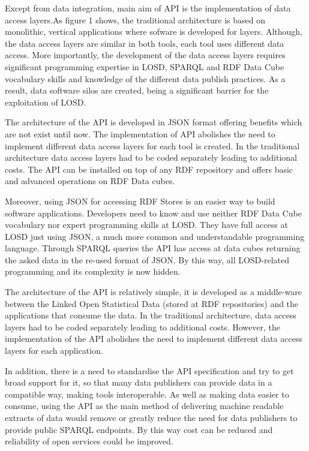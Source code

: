\documentclass{llncs}
\begin{document}
Except from data integration, main aim of API is the implementation of data access layers.As figure 1 shows, the traditional architecture is based on monolithic, vertical applications where sofware is developed for layers. Although, the data access layers are similar in both
tools, each tool uses different data access. More importantly, the development of the data access layers requires significant programming expertise in LOSD, SPARQL and RDF Data Cube vocabulary skills and knowledge of the different data publish practices. As a result, data software silos are created, being a significant barrier for the exploitation of LOSD. 

The architecture of the API is developed in JSON format offering benefits which are not exist until now. The implementation of API abolishes the need to implement different data access layers for each tool is created. In the traditional architecture data access layers had to be coded separately leading to additional costs. The API can be installed on top of any RDF repository and offers basic and advanced operations on RDF Data cubes.
 
Moreover, using JSON for accessing RDF Stores is an easier way to build software applications. Developers need to know and use neither RDF Data Cube vocabulary nor expert programming skills at LOSD. They have full access at LOSD just using JSON, a much more common and understandable programming language. Through SPARQL queries the API has access at data cubes returning the asked data in the re-used format of JSON. By this way, all LOSD-related programming and its complexity is now hidden.

The architecture of the API is relatively simple, it is developed as a middle-ware between the Linked Open Statistical Data (stored at RDF repositories) and the applications that consume the data. In the traditional architecture, data access layers had to be coded separately leading to additional costs. However, the implementation of the API abolishes the need to implement different data access layers for each application. 

In addition, there is a need to standardise the API specification and try to get broad support for it, so that many data publishers can provide data in a compatible way, making tools interoperable. As well as making data easier to consume, using the API as the main method of delivering machine readable extracts of data would remove or greatly reduce the need for data publishers to provide public SPARQL endpoints. By this way cost can be reduced and reliability of open services could be improved.
\end{document}
